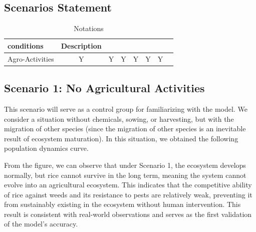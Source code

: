 \documentclass{HZNUMCM}
\begin{document}
      \subsection{Scenarios Statement}
        \begin{table}[H]
          \centering
          \caption{Notations}
          \begin{tabular}{lccccccc}
            \toprule
            \rowcolor{customcolor!40} %
            conditions & Description\\
            \midrule
            Agro-Activities & Y & Y & Y & Y & Y & Y \\

            \bottomrule
          \end{tabular}
          \label{tab:Notations}
        \end{table}
      \subsection{Scenario 1: No Agricultural Activities}
        This scenario will serve as a control group for familiarizing with the model. 
        We consider a situation without chemicals, sowing, or harvesting, 
        but with the migration of other species (since the migration of other species is an inevitable result of ecosystem maturation). 
        In this situation, we obtained the following population dynamics curve.
        \begin{figure}[H]
        \end{figure}
        From the figure, we can observe that under Scenario 1, the ecosystem develops normally, 
        but rice cannot survive in the long term, meaning the system cannot evolve into an agricultural ecosystem. 
        This indicates that the competitive ability of rice against weeds and its resistance to pests are relatively weak, 
        preventing it from sustainably existing in the ecosystem without human intervention. 
        This result is consistent with real-world observations and serves as the first validation of the model's accuracy.
\end{document}
